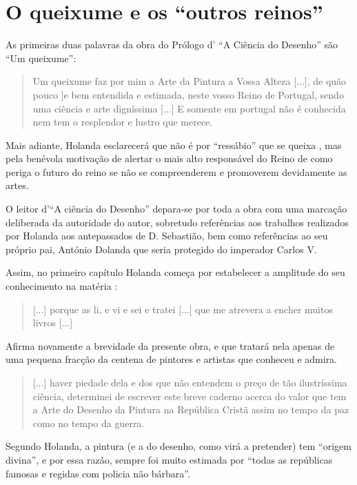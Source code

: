 \documentclass{article}
\begin{document}
\section{O queixume e os ``outros reinos''}

As primeiras duas palavras da obra do Prólogo d' ``A Ciência do
Desenho'' são ``Um queixume'':

\begin{quote}
  Um queixume faz por mim a Arte da Pintura a Vossa Alteza [...], de
  quão pouco ]e bem entendida e estimada, neste vosso Reino de
    Portugal, sendo uma ciência e arte digníssima [...] E somente em
    portugal não é conhecida nem tem o resplendor e lustro que merece.
\end{quote}

Mais adiante, Holanda esclarecerá que não é por ``ressábio'' que se
queixa \cite[fl.36v]{holanda}, mas pela benévola motivação de alertar
o mais alto responsável do Reino de como periga o futuro do reino se
não se compreenderem e promoverem devidamente as artes.

O leitor d'``A ciência do Desenho'' depara-se por toda a obra com uma
marcação deliberada da autoridade do autor, sobretudo referências aos
trabalhos realizados por Holanda aos antepassados de D. Sebastião, bem
como referências ao seu próprio pai, António Dolanda que seria
protegido do imperador Carlos V.

Assim, no primeiro capítulo Holanda começa por estabelecer a amplitude
do seu conhecimento na matéria \cite[fl.34r]{holanda}:

\begin{quote}
  [...] porque as li, e vi e sei e tratei [...] que me atrevera a
  encher muitos livros [...]
\end{quote}

Afirma novamente a brevidade da presente obra, e que tratará nela
apenas de uma pequena fracção da centena de pintores e artistas que
conheceu e admira.

\begin{quote}
  [...] haver piedade dela e dos que não entendem o preço de tão
  ilustríssima ciência, determinei de escrever este breve caderno
  acerca do valor que tem a Arte do Desenho da Pintura na República
  Cristã assim no tempo da paz como no tempo da guerra.
\end{quote}

Segundo Holanda, a pintura (e a do desenho, como virá a pretender) tem
``origem divina'', e por essa razão, sempre foi muito estimada por
``todas as repúblicas famosas e regidas com policia não bárbara''.
\end{document}
